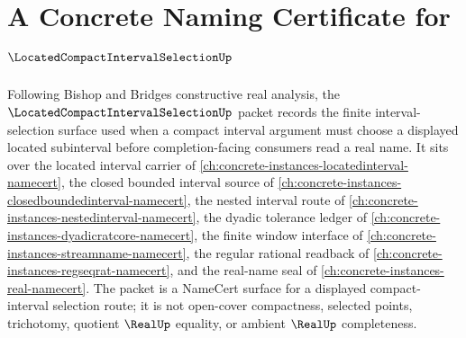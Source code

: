 \chapter{A Concrete Naming Certificate for $\LocatedCompactIntervalSelectionUp$}
\label{ch:concrete-instances-located-compact-interval-selection-namecert}

Following Bishop and Bridges constructive real analysis, the $\LocatedCompactIntervalSelectionUp$ packet records the finite interval-selection surface used when a compact interval argument must choose a displayed located subinterval before completion-facing consumers read a real name. It sits over the located interval carrier of \autoref{ch:concrete-instances-locatedinterval-namecert}, the closed bounded interval source of \autoref{ch:concrete-instances-closedboundedinterval-namecert}, the nested interval route of \autoref{ch:concrete-instances-nestedinterval-namecert}, the dyadic tolerance ledger of \autoref{ch:concrete-instances-dyadicratcore-namecert}, the finite window interface of \autoref{ch:concrete-instances-streamname-namecert}, the regular rational readback of \autoref{ch:concrete-instances-regseqrat-namecert}, and the real-name seal of \autoref{ch:concrete-instances-real-namecert}. The packet is a NameCert surface for a displayed compact-interval selection route; it is not open-cover compactness, selected points, trichotomy, quotient $\RealUp$ equality, or ambient $\RealUp$ completeness.

